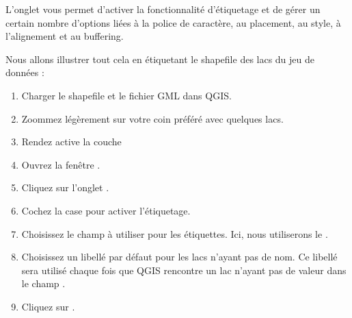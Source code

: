 L'onglet  vous permet d'activer la fonctionnalit\'e d'\'etiquetage et de g\'erer un certain nombre d'options li\'ees \`a la police de caract\`ere, au placement, au style, \`a l'alignement et au buffering.

Nous allons illustrer tout cela en \'etiquetant le shapefile des lacs du jeu de donn\'ees  :

\begin{enumerate}
\item Charger le shapefile  et le fichier GML  dans QGIS.
\item Zoommez l\'eg\`erement sur votre coin pr\'ef\'er\'e avec quelques lacs.
\item Rendez active la couche 
\item Ouvrez la fen\^etre .
\item Cliquez sur l'onglet .
\item Cochez la case  pour activer l'\'etiquetage.
\item Choisissez le champ \`a utiliser pour les \'etiquettes. Ici, nous utiliserons le .
\item Choisissez un libell\'e par d\'efaut pour les lacs n'ayant pas de nom. Ce libell\'e sera utilis\'e chaque fois que QGIS rencontre un lac n'ayant pas de valeur dans le champ .
\item Cliquez sur .
\end{enumerate}

